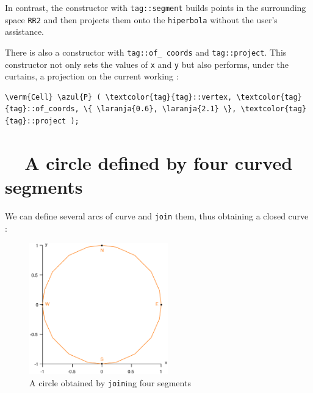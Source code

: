 \noindent In contrast, the {\small\tt{}} constructor with
{\small\tt\textcolor{tag}{tag}::segment} builds points in the surrounding space {\small\tt RR2}
and then projects them onto the {\small\tt hiperbola} without the user's assistance.

There is also a {\small\tt{}} constructor with {\small\tt\textcolor{tag}{tag}::of\_\,coords}
and {\small\tt\textcolor{tag}{tag}::project}.
This constructor not only sets the values of {\small\tt x} and {\small\tt y} but also
performs, under the curtains, a projection on the current working {\small\tt{}} :

\begin{Verbatim}[commandchars=\\\{\},formatcom=\small\tt,baselinestretch=0.94]
   \verm{Cell} \azul{P} ( \textcolor{tag}{tag}::vertex, \textcolor{tag}{tag}::of_coords, \{ \laranja{0.6}, \laranja{2.1} \}, \textcolor{tag}{tag}::project );
\end{Verbatim}


\section{~~A circle defined by four curved segments}\label{\numb section 2.\numb parag 5}

We can define several arcs of curve and {\small\tt join} them, thus obtaining a closed curve :
\medskip

\begin{figure}[ht] \centering
  \includegraphics[width=60mm]{circle}
  \caption{A circle obtained by {\small\tt join}ing four segments}
  \label{\numb section 2.\numb fig 5}
\end{figure}

